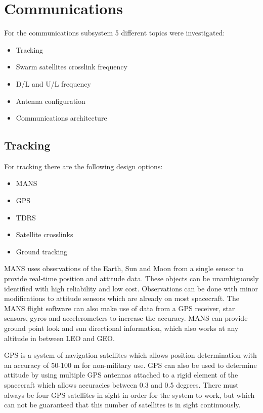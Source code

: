 \section{Communications}
\label{blDOCOM}

For the communications subsystem 5 different topics were investigated:
\begin{itemize}
\item Tracking
\item Swarm satellites crosslink frequency
\item D/L and U/L frequency
\item Antenna configuration
\item Communications architecture
\end{itemize}

\subsection{Tracking}
For tracking there are the following design options:
\begin {itemize}
\item \ac{MANS}
\item \acs{GPS}
\item \ac{TDRS}
\item Satellite crosslinks
\item Ground tracking
\end {itemize}

MANS uses observations of the Earth, Sun and Moon from a single sensor to provide real-time position and attitude data. These objects can be unambiguously identified with high reliability and low cost. Observations can be done with minor modifications to attitude sensors which are already on most spacecraft. The MANS flight software can also make use of data from a GPS receiver, star sensors, gyros and accelerometers to increase the accuracy. MANS can provide ground point look and sun directional information, which also works at any altitude in between \acs{LEO} and \acs{GEO}.

GPS is a system of navigation satellites which allows position determination with an accuracy of 50-100 m for non-military use. GPS can also be used to determine attitude by using multiple GPS antennas attached to a rigid element of the spacecraft which allows accuracies between 0.3 and 0.5 degrees. There must always be four GPS satellites in sight in order for the system to work, but which can not be guaranteed that this number of satellites is in sight continuously.

